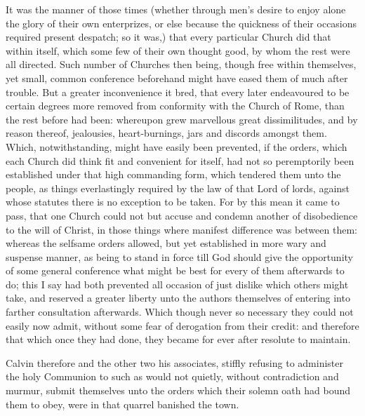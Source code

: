 It was the manner of those times (whether through men’s desire to enjoy alone the glory of their own enterprizes, or else because the quickness of their occasions required present despatch; so it was,) that every particular Church did that within itself, which some few of their own thought good, by whom the rest were all directed. Such number of Churches then being, though free within themselves, yet small, common conference beforehand might have eased them of much after trouble. But a greater inconvenience it bred, that every later endeavoured to be certain degrees more removed from conformity with the Church of Rome, than the rest before had been: whereupon grew marvellous great dissimilitudes, and by reason thereof, jealousies, heart-burnings, jars and  discords amongst them. Which, notwithstanding, might have easily been prevented, if the orders, which each Church did think fit and convenient for itself, had not so peremptorily been established under that high commanding form, which tendered them unto the people, as things everlastingly required by the law of that Lord of lords, against whose statutes there is no exception to be taken. For by this mean it came to pass, that one Church could not but accuse and condemn another of disobedience to the will of Christ, in those things where manifest difference was between them: whereas the selfsame orders allowed, but yet established in more wary and suspense manner, as being to stand in force till God should give the opportunity of some general conference what might be best for every of them afterwards to do; this I say had both prevented all occasion of just dislike which others might take, and reserved a greater liberty unto the authors themselves of entering into farther consultation afterwards. Which though never so necessary they could not easily now admit, without some fear of derogation from their credit: and therefore that which once they had done, they became for ever after resolute to maintain.

Calvin therefore and the other two his associates, stiffly refusing to administer the holy Communion to such as would not quietly, without contradiction and murmur, submit themselves unto the orders which their solemn oath had bound them to obey, were in that quarrel banished the town.

